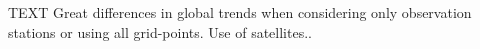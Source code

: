 \documentclass[journal abbreviation, manuscript]{copernicus}
\begin{document}
\conclusions  %
TEXT
Great differences in global trends when considering only observation stations or using all grid-points. Use of satellites..












\appendix
\section{}    %

\subsection{}     %


\noappendix       %




\appendixfigures  %
\end{document}
